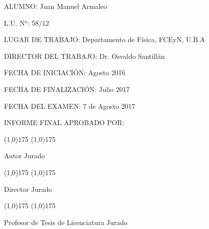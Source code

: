 


\newpage






\cleardoublepage



\vspace{11pt}


ALUMNO: Juan Manuel Armaleo


\vspace{11pt}

L.U. N$^o$: 58/12


\vspace{11pt}

LUGAR DE TRABAJO: Departamento de Física, FCEyN, U.B.A
\vspace{11pt}

DIRECTOR DEL TRABAJO: Dr. Osvaldo Santillán


\vspace{11pt}

FECHA DE INICIACIÓN: Agosto 2016


\vspace{11pt}

FECHA DE FINALIZACIÓN: Julio 2017


\vspace{11pt}

FECHA DEL EXAMEN: 7 de Agosto 2017


\vspace{11pt}

INFORME FINAL APROBADO POR:


\vspace{4.5cm}

\line(1,0){175} \hspace{60pt} \line(1,0){175}

Autor \hspace{205pt} Jurado

\vspace{2cm}

\line(1,0){175} \hspace{60pt} \line(1,0){175}

Director \hspace{195pt} Jurado

\vspace{2cm}

\line(1,0){175} \hspace{60pt} \line(1,0){175}

Profesor de Tesis de Licenciatura \hspace{75pt} Jurado

\mbox{}